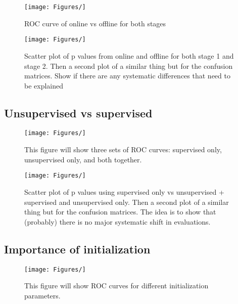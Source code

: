 \documentclass[useAMS,usenatbib,a4paper]{mn2e}
\begin{document}
\begin{figure}
\begin{center}
    \texttt{[image: Figures/]}
\end{center}
\caption{ROC curve of online vs offline for both stages}
\label{fig:}
\end{figure}

\begin{figure}
\begin{center}
    \texttt{[image: Figures/]}
\end{center}
\caption{Scatter plot of p values from online and offline for both stage 1 and
stage 2. Then a second plot of a similar thing but for the confusion matrices.
Show if there are any systematic differences that need to be explained}
\label{fig:}
\end{figure}

\subsection{Unsupervised vs supervised}

\begin{figure}
\begin{center}
    \texttt{[image: Figures/]}
\end{center}
\caption{This figure will show three sets of ROC curves: supervised only,
unsupervised only, and both together.}
\label{fig:}
\end{figure}

\begin{figure}
\begin{center}
    \texttt{[image: Figures/]}
\end{center}
\caption{Scatter plot of p values using supervised only vs unsupervised +
supervised and unsupervised only. Then a second plot of a similar thing but for
the confusion matrices. The idea is to show that (probably) there is no major
systematic shift in evaluations.}
\label{fig:}
\end{figure}



\subsection{Importance of initialization}

\begin{figure}
\begin{center}
    \texttt{[image: Figures/]}
\end{center}
\caption{This figure will show ROC curves for different initialization parameters.}
\label{fig:}
\end{figure}
\end{document}

